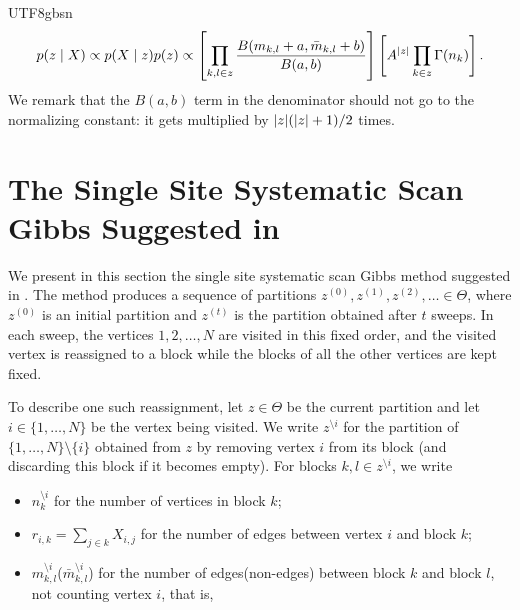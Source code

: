 \documentclass[12pt]{report}
\newcommand{\squared}[1]{\left [ #1 \right ]}
\theoremstyle{plain}
\theoremstyle{definition}
\begin{document}
\begin{CJK*}{UTF8}{gbsn}
\begin{equation}\label{eq:SBM_posterior}
  p(z \mid X) \propto p(X \mid z) p(z)
  \propto \squared{
  \prod_{k,l \in z} \frac{B(m_{k,l}+a, \bar{m}_{k,l}+b)}{B(a,b)}}
  \squared{A^{\abs{z}} \prod_{k \in z} \Gamma(n_k)}.
\end{equation}
We remark that the $B(a,b)$ term in the denominator 
should not go to the normalizing constant:
it gets multiplied by $\abs{z}(\abs{z}+1)/2$ times.

\section{The Single Site Systematic Scan Gibbs Suggested in \cite{Schmidt_Morup_2013}}
\label{sec:gibbs}

We present in this section the single site 
systematic scan Gibbs method suggested in \cite{Schmidt_Morup_2013}.
The method produces a sequence of partitions
$z^{(0)}, z^{(1)}, z^{(2)}, \ldots \in \Theta$,
where $z^{(0)}$ is an initial partition
and $z^{(t)}$ is the partition obtained after $t$ sweeps.
In each sweep, the vertices $1, 2, \ldots, N$ are visited in this fixed order,
and the visited vertex is reassigned to a block
while the blocks of all the other vertices are kept fixed.

To describe one such reassignment,
let $z \in \Theta$ be the current partition
and let $i \in \{1, \ldots, N\}$ be the vertex being visited.
We write $z^{\setminus i}$ for the partition of $\{1, \ldots, N\} \setminus \{i\}$
obtained from $z$ by removing vertex $i$ from its block
(and discarding this block if it becomes empty).
For blocks $k, l \in z^{\setminus i}$, we write
\begin{itemize}
  \item $n_k^{\setminus i}$ for the number of vertices in block $k$;
  \item $r_{i,k} = \sum_{j \in k} X_{i,j}$ for the number of edges between vertex $i$ and block $k$;
  \item $m_{k,l}^{\setminus i}$($\bar{m}_{k,l}^{\setminus i}$) for the number of edges(non-edges)
  between block $k$ and block $l$, not counting vertex $i$, that is,
\end{itemize}


\end{CJK*}
\end{document}
